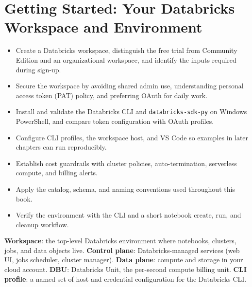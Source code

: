\chapter{Getting Started: Your Databricks Workspace and Environment}
%
%

\begin{objectives}
\begin{itemize}
    \item Create a Databricks workspace, distinguish the free trial from Community Edition and an organizational workspace, and identify the inputs required during sign-up.
    \item Secure the workspace by avoiding shared admin use, understanding personal access token (PAT) policy, and preferring OAuth for daily work.
    \item Install and validate the Databricks CLI and \texttt{databricks-sdk-py} on Windows PowerShell, and compare token configuration with OAuth profiles.
    \item Configure CLI profiles, the workspace host, and VS Code so examples in later chapters can run reproducibly.
    \item Establish cost guardrails with cluster policies, auto-termination, serverless compute, and billing alerts.
    \item Apply the catalog, schema, and naming conventions used throughout this book.
    \item Verify the environment with the CLI and a short notebook create, run, and cleanup workflow.
\end{itemize}
\end{objectives}

\begin{keyterms}
\textbf{Workspace}: the top-level Databricks environment where notebooks, clusters, jobs, and data objects live. \textbf{Control plane}: Databricks-managed services (web UI, jobs scheduler, cluster manager). \textbf{Data plane}: compute and storage in your cloud account. \textbf{DBU}: Databricks Unit, the per-second compute billing unit. \textbf{CLI profile}: a named set of host and credential configuration for the Databricks CLI.
\end{keyterms}

